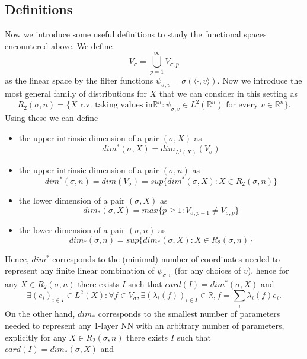 \documentclass[11pt]{article} %
\begin{document}
\subsection{Definitions}
Now we introduce some useful definitions to study the functional spaces encountered above. We define 
$$V_\sigma = \bigcup_{p=1}^\infty V_{\sigma, p}$$
as the linear space by the filter functions $\psi_{\sigma, v} = \sigma(\langle \cdot, v\rangle)$. Now we introduce the most general family of distributions for $X$ that we can consider in this setting as
$$R_2(\sigma, n) = \{X \text{ r.v. taking values in} \mathbb{R}^n : \psi_{\sigma, v} \in L^2(\mathbb{R}^n) \text{ for every } v \in \mathbb{R}^n \}.$$  
Using these we can define
\begin{itemize}
	\item the upper intrinsic dimension of a pair $(\sigma, X)$ as
	\begin{equation}
		dim^*(\sigma, X) = dim_{L^2(X)}(V_\sigma)
	\end{equation}
	\item the upper intrinsic dimension of a pair $(\sigma, n)$ as
	\begin{equation}
		dim^*(\sigma, n) = dim(V_\sigma) = sup\{dim^*(\sigma, X) : X\in R_2(\sigma, n)\}
	\end{equation}
	\item  the lower dimension of a pair $(\sigma, X)$ as
	\begin{equation}
		dim_*(\sigma, X) = max\{p\geq 1: V_{\sigma, p-1} \neq V_{\sigma, p}\}
	\end{equation}
	\item the lower dimension of a pair $(\sigma, n)$ as 
	\begin{equation}
		dim_*(\sigma, n) = sup\{dim_*(\sigma, X) : X \in R_2(\sigma, n)\}
	\end{equation}
\end{itemize}
Hence, $dim^*$ corresponds to the (minimal) number of coordinates needed to represent any finite linear combination of $\psi_{\sigma, v}$ (for any choices of $v$), hence for any $X\in R_2(\sigma, n)$ there exists $I$ such that $card(I) = dim^*(\sigma, X)$ and
$$\exists (e_i)_{i\in I} \in L^2(X) : \forall f \in V_\sigma, \exists (\lambda_i(f))_{i\in I} \in \mathbb{R}, f = \sum_i \lambda_i(f)e_i.$$
On the other hand, $dim_*$ corresponds to the smallest number of parameters needed to represent any 1-layer NN with an arbitrary number of parameters, explicitly for any $X\in R_2(\sigma, n)$ there exists $I$ such that $card(I) = dim_*(\sigma, X)$ and
\end{document}
